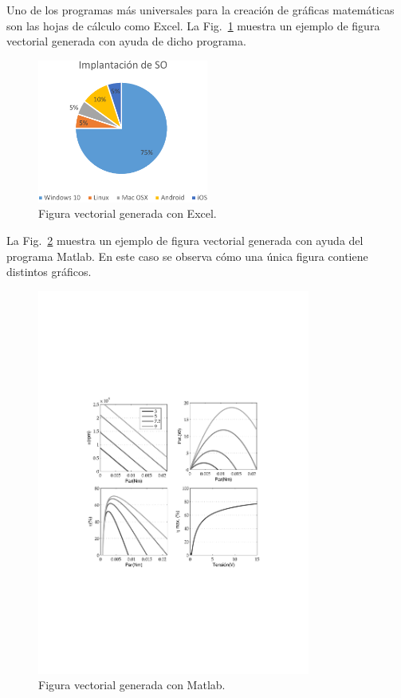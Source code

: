 \documentclass[ 		%
	11pt,				%
	a4paper,			%
	twoside,			%
	openright,			%
	final       		%
]{book}
\begin{document}
Uno de los programas más universales para la creación de gráficas matemáticas son las hojas de cálculo como Excel. La Fig.~\ref{fig:excel} muestra un ejemplo de figura vectorial generada con ayuda de dicho programa.

\begin{figure}[H]
	\centering
	\includegraphics[width=0.5\textwidth]{EjFigsExcelOrig-crop} 
	\caption[Gráfico de Excel]{Figura vectorial generada con Excel.}
	\label{fig:excel}
\end{figure}

La Fig.~\ref{fig:matlabGrafs} muestra un ejemplo de figura vectorial generada con ayuda del programa Matlab. En este caso se observa cómo una única figura contiene distintos gráficos. 

\begin{figure}[H]
	\centering
	\includegraphics[width=0.8\textwidth]{matlabGrafs} 
	\caption[Gráfico de Matlab]{Figura vectorial generada con Matlab.}
	\label{fig:matlabGrafs}
\end{figure}
\end{document}
